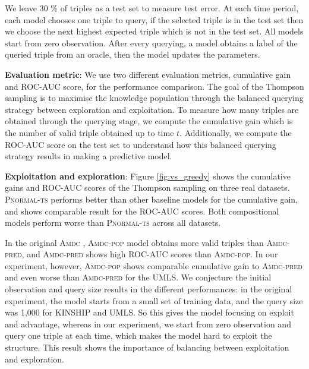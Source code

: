 We leave 30 \% of triples as a test set to measure test error.
At each time period, each model chooses one triple to query,
if the selected triple is in the test set then we choose the next highest expected triple which is not in the test set.
All models start from zero observation.
After every querying, a model obtains a label of the queried triple from an oracle,
then the model updates the parameters.

\textbf{Evaluation metric}: We use two different evaluation metrics, cumulative gain and ROC-AUC score,
for the performance comparison. The goal of the Thompson sampling is to maximise the knowledge
population through the balanced querying strategy between exploration and exploitation.
To measure how many triples are obtained through the querying stage, we compute the cumulative
gain which is the number of valid triple obtained up to time $t$. Additionally, we compute the ROC-AUC score on
the test set to understand how this balanced querying strategy results in making a predictive model.

\textbf{Exploitation and exploration}:
Figure \ref{fig:vs_greedy} shows
the cumulative gains and ROC-AUC scores of the Thompson sampling on three real datasets.
\textsc{Pnormal-ts} performs better than other baseline models for the cumulative gain, and shows comparable result for the ROC-AUC scores. Both compositional models perform worse than \textsc{Pnormal-ts} across all datasets.

In the original \textsc{Amdc} \cite{kajino2015active}, \textsc{Amdc-pop} model obtains more
valid triples than \textsc{Amdc-pred}, and \textsc{Amdc-pred} shows high ROC-AUC scores than \textsc{Amdc-pop}.
In our experiment, however, \textsc{Amdc-pop} shows comparable cumulative gain to \textsc{Amdc-pred}
and even worse than \textsc{Amdc-pred} for the UMLS. We conjecture the initial observation and query size results in the different performances: in the original experiment, the model starts
from a small set of training data, and the query size was 1,000 for KINSHIP and UMLS. So this gives the model focusing on exploit and advantage,
whereas in our experiment, we start from zero
observation and query one triple at each time, which makes the model hard to exploit the structure. This result shows
the importance of balancing between exploitation and exploration.


